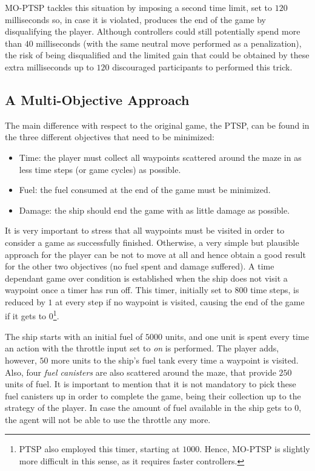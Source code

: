\documentclass[conference]{IEEEtran}
\begin{document}
MO-PTSP tackles this situation by imposing a second time limit, set to $120$ milliseconds so, in case it is violated, produces the end of the game by disqualifying the player. Although controllers could still potentially spend more than $40$ milliseconds (with the same neutral move performed as a penalization), the risk of being disqualified and the limited gain that could be obtained by these extra milliseconds up to $120$ discouraged participants to performed this trick.

\subsection{A Multi-Objective Approach}

The main difference with respect to the original game, the PTSP, can be found in the three different objectives that need to be minimized:

\begin{itemize}
\item Time: the player must collect all waypoints scattered around the maze in as less time steps (or game cycles) as possible.
\item Fuel: the fuel consumed at the end of the game must be minimized.
\item Damage: the ship should end the game with as little damage as possible.
\end{itemize}

It is very important to stress that all waypoints must be visited in order to consider a game as successfully finished. Otherwise, a very simple but plausible approach for the player can be not to move at all and hence obtain a good result for the other two objectives (no fuel spent and damage suffered). A time dependant game over condition is established when the ship does not visit a waypoint once a timer has run off. This timer, initially set to $800$ time steps, is reduced by $1$ at every step if no waypoint is visited, causing the end of the game if it gets to $0$\footnote{PTSP also employed this timer, starting at $1000$. Hence, MO-PTSP is slightly more difficult in this sense, as it requires faster controllers.}. 

The ship starts with an initial fuel of $5000$ units, and one unit is spent every time an action with the throttle input set to \textit{on} is performed. The player adds, however, $50$ more units to the ship's fuel tank every time a waypoint is visited. Also, four \textit{fuel canisters} are also scattered around the maze, that provide $250$ units of fuel. It is important to mention that it is not mandatory to pick these fuel canisters up in order to complete the game, being their collection up to the strategy of the player. In case the amount of fuel available in the ship gets to $0$, the agent will not be able to use the throttle any more. 
\end{document}
